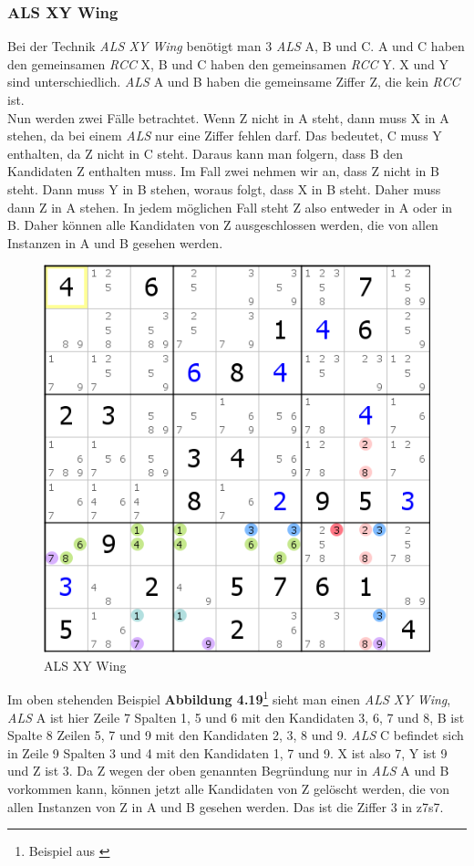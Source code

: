 \newpage
\subsubsection{ALS XY Wing}
Bei der Technik \textit{ALS XY Wing} benötigt man 3 \textit{ALS} A, B und C. A und C haben den gemeinsamen \textit{RCC} X, B und C haben den gemeinsamen \textit{RCC} Y. X und Y sind unterschiedlich. \textit{ALS} A und B haben die gemeinsame Ziffer Z, die kein \textit{RCC} ist.\\
Nun werden zwei Fälle betrachtet. Wenn Z nicht in A steht, dann muss X in A stehen, da bei einem \textit{ALS} nur eine Ziffer fehlen darf. Das bedeutet, C muss Y enthalten, da Z nicht in C steht. Daraus kann man folgern, dass B den Kandidaten Z enthalten muss. Im Fall zwei nehmen wir an, dass Z nicht in B steht. Dann muss Y in B stehen, woraus folgt, dass X in B steht. Daher muss dann Z in A stehen. In jedem möglichen Fall steht Z also entweder in A oder in B. Daher können alle Kandidaten von Z ausgeschlossen werden, die von allen Instanzen in A und B gesehen werden.

\begin{figure}[h]
\begin{center}
\includegraphics{./img/ALS_XY_Wing.png}
\caption{ALS XY Wing}
\end{center}
\end{figure}

Im oben stehenden Beispiel \textbf{Abbildung 4.19}\footnote{Beispiel aus \cite{HDKALSXYWing}} sieht man einen \textit{ALS XY Wing}, \textit{ALS} A ist hier Zeile 7 Spalten 1, 5 und 6 mit den Kandidaten 3, 6, 7 und 8, B ist Spalte 8 Zeilen 5, 7 und 9 mit den Kandidaten 2, 3, 8 und 9. \textit{ALS} C befindet sich in Zeile 9 Spalten 3 und 4 mit den Kandidaten 1, 7 und 9. X ist also 7, Y ist 9 und Z ist 3. Da Z wegen der oben genannten Begründung nur in \textit{ALS} A und B vorkommen kann, können jetzt alle Kandidaten von Z gelöscht werden, die von allen Instanzen von Z in A und B gesehen werden. Das ist die Ziffer 3 in z7s7.